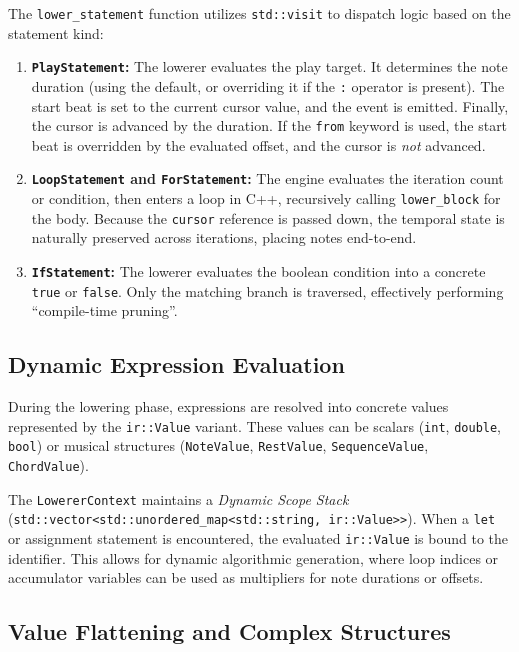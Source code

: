 The \texttt{lower\_statement} function utilizes \texttt{std::visit} to dispatch logic based on the statement kind:
\begin{enumerate}
  \item \textbf{\texttt{PlayStatement}:} The lowerer evaluates the play target.
    It determines the note duration (using the default, or overriding it if the \texttt{:} operator is present).
    The start beat is set to the current cursor value, and the event is emitted.
    Finally, the cursor is advanced by the duration.
    If the \texttt{from} keyword is used, the start beat is overridden by the evaluated offset, and the cursor is
    \textit{not} advanced.
  \item \textbf{\texttt{LoopStatement} and \texttt{ForStatement}:} The engine evaluates the iteration count or
    condition, then enters a loop in C++, recursively calling \texttt{lower\_block} for the body.
    Because the \texttt{cursor} reference is passed down, the temporal state is naturally preserved across iterations,
    placing notes end-to-end.
  \item \textbf{\texttt{IfStatement}:} The lowerer evaluates the boolean condition into a concrete \texttt{true} or
    \texttt{false}.
    Only the matching branch is traversed, effectively performing ``compile-time pruning''.
\end{enumerate}

\subsection{Dynamic Expression Evaluation}\label{subsec:dynamic-expression-evaluation}

During the lowering phase, expressions are resolved into concrete values represented by the \texttt{ir::Value} variant.
These values can be scalars (\texttt{int}, \texttt{double}, \texttt{bool}) or musical structures (\texttt{NoteValue},
\texttt{RestValue}, \texttt{SequenceValue}, \texttt{ChordValue}).

The \texttt{LowererContext} maintains a \textit{Dynamic Scope Stack}
(\texttt{std::vector<std::unordered\_map<std::string, ir::Value>>}).
When a \texttt{let} or assignment statement is encountered, the evaluated \texttt{ir::Value} is bound to the identifier.
This allows for dynamic algorithmic generation, where loop indices or accumulator variables can be used as multipliers
for note durations or offsets.

\subsection{Value Flattening and Complex Structures}\label{subsec:value-flattening-and-complex-structures}

